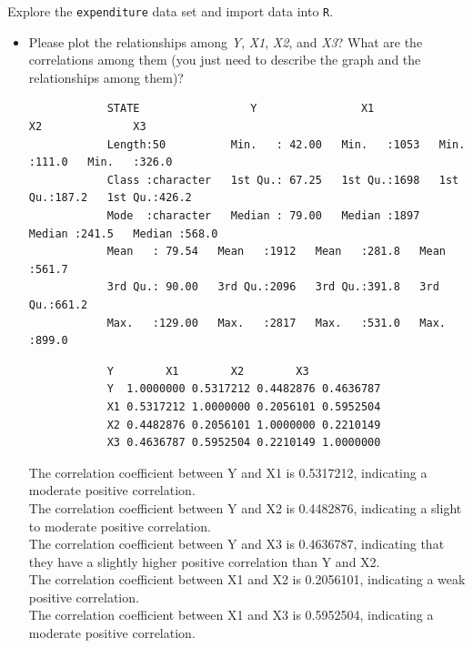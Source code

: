 \documentclass[12pt,letterpaper]{article}
\begin{document}
	\vspace{.5cm}
	\noindent Explore the \texttt{expenditure} data set and import data into \texttt{R}.
	\vspace{.5cm}
	\begin{itemize}
		
		\item
		Please plot the relationships among \emph{Y}, \emph{X1}, \emph{X2}, and \emph{X3}? What are the correlations among them (you just need to describe the graph and the relationships among them)?
		
		
		\begin{verbatim}
			STATE                 Y                X1             X2              X3       
			Length:50          Min.   : 42.00   Min.   :1053   Min.   :111.0   Min.   :326.0  
			Class :character   1st Qu.: 67.25   1st Qu.:1698   1st Qu.:187.2   1st Qu.:426.2  
			Mode  :character   Median : 79.00   Median :1897   Median :241.5   Median :568.0  
			Mean   : 79.54   Mean   :1912   Mean   :281.8   Mean   :561.7  
			3rd Qu.: 90.00   3rd Qu.:2096   3rd Qu.:391.8   3rd Qu.:661.2  
			Max.   :129.00   Max.   :2817   Max.   :531.0   Max.   :899.0 
		\end{verbatim} 
		  
		\begin{verbatim}
			Y        X1        X2        X3
			Y  1.0000000 0.5317212 0.4482876 0.4636787
			X1 0.5317212 1.0000000 0.2056101 0.5952504
			X2 0.4482876 0.2056101 1.0000000 0.2210149
			X3 0.4636787 0.5952504 0.2210149 1.0000000
		\end{verbatim} 
		
		The correlation coefficient between Y and X1 is 0.5317212, indicating a moderate positive correlation.\\
		
		The correlation coefficient between Y and X2 is 0.4482876, indicating a slight to moderate positive correlation.\\
		
		The correlation coefficient between Y and X3 is 0.4636787, indicating that they have a slightly higher positive correlation than Y and X2.\\
		
		The correlation coefficient between X1 and X2 is 0.2056101, indicating a weak positive correlation.\\
		
		The correlation coefficient between X1 and X3 is 0.5952504, indicating a moderate positive correlation.\\
		

\end{itemize}
\end{document}
